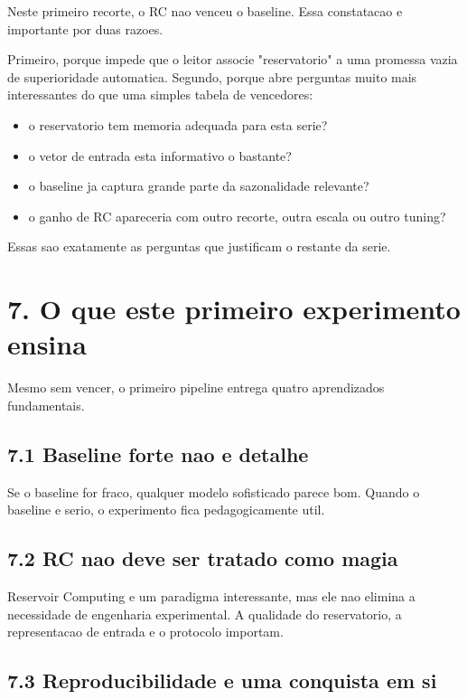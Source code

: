 \documentclass[12pt]{article}
\providecommand{\tightlist}{%
  \setlength{\itemsep}{0pt}\setlength{\parskip}{0pt}}
\begin{document}
Neste primeiro recorte, o RC nao venceu o baseline. Essa constatacao e importante por duas razoes.

Primeiro, porque impede que o leitor associe "reservatorio" a uma promessa vazia de superioridade automatica. Segundo, porque abre perguntas muito mais interessantes do que uma simples tabela de vencedores:

\begin{itemize}
\tightlist
\item
  o reservatorio tem memoria adequada para esta serie?
\item
  o vetor de entrada esta informativo o bastante?
\item
  o baseline ja captura grande parte da sazonalidade relevante?
\item
  o ganho de RC apareceria com outro recorte, outra escala ou outro tuning?
\end{itemize}

Essas sao exatamente as perguntas que justificam o restante da serie.

\section{7. O que este primeiro experimento ensina}\label{7-o-que-este-primeiro-experimento-ensina}

Mesmo sem vencer, o primeiro pipeline entrega quatro aprendizados fundamentais.

\subsection{7.1 Baseline forte nao e detalhe}\label{71-baseline-forte-nao-e-detalhe}

Se o baseline for fraco, qualquer modelo sofisticado parece bom. Quando o baseline e serio, o experimento fica pedagogicamente util.

\subsection{7.2 RC nao deve ser tratado como magia}\label{72-rc-nao-deve-ser-tratado-como-magia}

Reservoir Computing e um paradigma interessante, mas ele nao elimina a necessidade de engenharia experimental. A qualidade do reservatorio, a representacao de entrada e o protocolo importam.

\subsection{7.3 Reproducibilidade e uma conquista em si}\label{73-reproducibilidade-e-uma-conquista-em-si}
\end{document}
